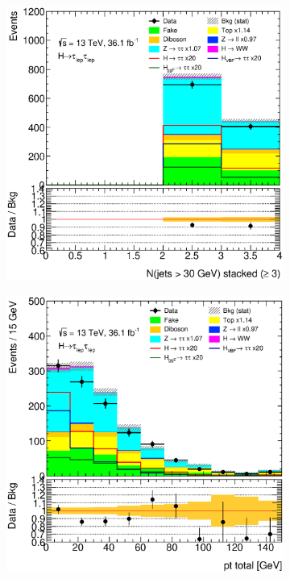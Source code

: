 \begin{figure}[htb]
\begin{subfigure}[t]{0.3\textwidth}
    \end{subfigure}
    \begin{subfigure}[t]{0.3\textwidth}
        \includegraphics[width=\textwidth]{./plots/mva/modeling/input_vars/VBF_DF/ll-CutMVAVBFCatDF-nJets30Stacked3-lin.eps}
    \end{subfigure}
    \begin{subfigure}[t]{0.3\textwidth}
        \includegraphics[width=\textwidth]{./plots/mva/modeling/input_vars/VBF_DF/ll-CutMVAVBFCatDF-PtTotal-lin.eps}

\end{subfigure}
\end{figure}
